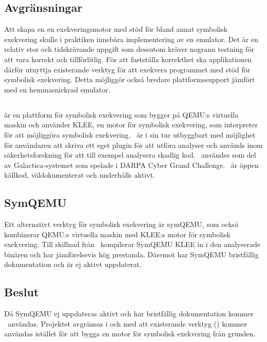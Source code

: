 \subsection{Avgränsningar}

Att skapa en en exekveringsmotor med stöd för bland annat symbolisk exekvering
skulle i praktiken innebära implementering av en emulator. Det är en relativ
stor och tidskrävande uppgift som dessutom kräver nogrann testning för att vara
korrekt och tillförlitlig. För att fastställa korrekthet ska applikationen
därför utnyttja existerande verktyg för att exekvera programmet med stöd för
symbolisk exekvering. Detta möjliggör också bredare plattformssupport jämfört
med en hemmasnickrad emulator.


\subsection{\stoe}

\stoe\cite{s2e} är en plattform för symbolisk exekvering som bygger på QEMU:s
virtuella maskin och använder KLEE\cite{klee}, en motor för symbolisk
exekvering, som interpreter för att möjliggöra symbolisk exekvering. \stoe\ är i
sin tur utbyggbart med möjlighet för användaren att skriva ett eget plugin för
att utföra analyser och används inom säkerhetsforskning för att till exempel
analysera skadlig kod. \stoe\ användes som del av Galactica-systemet som spelade
i DARPA Cyber Grand Challenge\cite{s2e_website}. \stoe\ är öppen källkod,
väldokumenterat och underhålls aktivt.

\subsection{SymQEMU}

Ett alternativt verktyg för symbolisk exekvering är symQEMU\cite{symqemu},
som också kombinerar QEMU:s virtuella maskin med KLEE:s motor för symbolisk
exekvering. Till skillnad från \stoe\ kompilerar SymQEMU KLEE in i den
analyserade binären och har jämförelsevis hög prestanda. Däremot har SymQEMU
bristfällig dokumentation och är ej aktivt uppdaterat.

\subsection{Beslut}

Då SymQEMU ej uppdateras aktivt och har bristfällig dokumentation kommer \stoe\
användas. Projektet avgränsas i och med att existerande verktyg (\stoe) kommer
användas istället för att bygga en motor för symbolisk exekvering från grunden.

